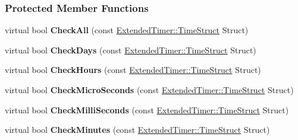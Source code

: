 \subsubsection*{Protected Member Functions}
\begin{DoxyCompactItemize}
\item 
\hypertarget{classMezzanine_1_1ExtendedTimer_affee9db7f13803b957e9369031997147}{
virtual bool {\bfseries CheckAll} (const \hyperlink{classMezzanine_1_1ExtendedTimer_a52119e2da54ea7ae5da0dc1f921a3b61}{ExtendedTimer::TimeStruct} Struct)}
\label{classMezzanine_1_1ExtendedTimer_affee9db7f13803b957e9369031997147}

\item 
\hypertarget{classMezzanine_1_1ExtendedTimer_a7111899f1af64dcc5355db632b8632d0}{
virtual bool {\bfseries CheckDays} (const \hyperlink{classMezzanine_1_1ExtendedTimer_a52119e2da54ea7ae5da0dc1f921a3b61}{ExtendedTimer::TimeStruct} Struct)}
\label{classMezzanine_1_1ExtendedTimer_a7111899f1af64dcc5355db632b8632d0}

\item 
\hypertarget{classMezzanine_1_1ExtendedTimer_a90740ae9d6b66c29b75ccc44967a97b9}{
virtual bool {\bfseries CheckHours} (const \hyperlink{classMezzanine_1_1ExtendedTimer_a52119e2da54ea7ae5da0dc1f921a3b61}{ExtendedTimer::TimeStruct} Struct)}
\label{classMezzanine_1_1ExtendedTimer_a90740ae9d6b66c29b75ccc44967a97b9}

\item 
\hypertarget{classMezzanine_1_1ExtendedTimer_aae842ab012d875eb71f7cf92d47ade79}{
virtual bool {\bfseries CheckMicroSeconds} (const \hyperlink{classMezzanine_1_1ExtendedTimer_a52119e2da54ea7ae5da0dc1f921a3b61}{ExtendedTimer::TimeStruct} Struct)}
\label{classMezzanine_1_1ExtendedTimer_aae842ab012d875eb71f7cf92d47ade79}

\item 
\hypertarget{classMezzanine_1_1ExtendedTimer_a696fd5b73f681b97a991c5d028145720}{
virtual bool {\bfseries CheckMilliSeconds} (const \hyperlink{classMezzanine_1_1ExtendedTimer_a52119e2da54ea7ae5da0dc1f921a3b61}{ExtendedTimer::TimeStruct} Struct)}
\label{classMezzanine_1_1ExtendedTimer_a696fd5b73f681b97a991c5d028145720}

\item 
\hypertarget{classMezzanine_1_1ExtendedTimer_acd37990cdb9c25a3ce738b5c062fd78c}{
virtual bool {\bfseries CheckMinutes} (const \hyperlink{classMezzanine_1_1ExtendedTimer_a52119e2da54ea7ae5da0dc1f921a3b61}{ExtendedTimer::TimeStruct} Struct)}
\label{classMezzanine_1_1ExtendedTimer_acd37990cdb9c25a3ce738b5c062fd78c}


\end{DoxyCompactItemize}
